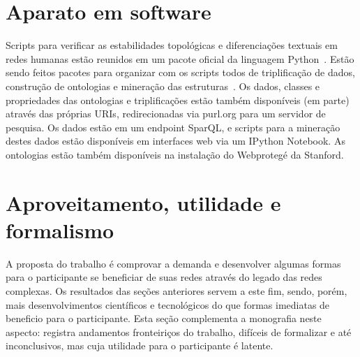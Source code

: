 \documentclass[a4paper,openright,12pt]{report} %
\begin{document}
\section{Aparato em software}
Scripts para verificar as estabilidades topológicas e diferenciações textuais em redes humanas estão reunidos em um pacote oficial da linguagem Python~\cite{gmanePack}.
Estão sendo feitos pacotes para organizar com os scripts todos
de triplificação de dados, construção de ontologias e mineração das
estruturas~\cite{participation, percolation}. 
Os dados, classes e propriedades das
ontologias e triplificações estão também disponíveis (em parte)
através das próprias URIs, redirecionadas via purl.org
para um servidor de pesquisa.
Os dados estão em um endpoint SparQL, e scripts para a mineração
destes dados estão disponíveis em interfaces web via um
IPython Notebook. As ontologias estão também disponíveis
na instalação do Webprotegé da Stanford.

\section{Aproveitamento, utilidade e formalismo}
A proposta do trabalho é comprovar a demanda e desenvolver algumas formas para o participante se beneficiar de suas redes através do legado das redes complexas.
Os resultados das seções anteriores servem a este fim, sendo, porém, mais desenvolvimentos científicos e tecnológicos do que formas imediatas
de beneficio para o participante.
Esta seção complementa a monografia neste aspecto:
registra andamentos fronteiriços do trabalho, difíceis de formalizar e até inconclusivos,
mas cuja utilidade para o participante é latente.
\end{document}
